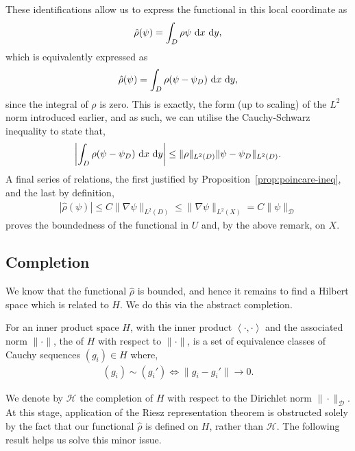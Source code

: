 These identifications allow us to express the functional in this local
coordinate as
\begin{align*}
	\hat{\rho}( \psi ) = \int_{D}{\rho \psi}\operatorname{\, d\!}{x}\operatorname{\, d\!}{y},
\end{align*}
which is equivalently expressed as
\begin{align*}
	\hat{\rho}( \psi ) = \int_{D}{\rho ( \psi - \psi_D )}\operatorname{\, d\!}{x}\operatorname{\, d\!}{y},
\end{align*}
since the integral of $ \rho $ is zero. This is exactly, the form (up to
scaling) of the $ L^2 $ norm introduced earlier, and as such, we can utilise the
Cauchy-Schwarz inequality to state that,
\begin{align*}
	\left| \int_{D}{\rho ( \psi-\psi_D )}\operatorname{\, d\!}{x}\operatorname{\, d\!}{y} \right| \leq \| \rho
	\|_{L^2(D)}\| \psi-\psi_D \|_{L^2(D)}.
\end{align*}
A final series of relations, the first justified by
Proposition~\ref{prop:poincare-ineq}, and the last by definition,
\begin{align*}
	| \hat{\rho}( \psi ) | \leq C \| \nabla \psi \|_{L^2 ( D )}
	\leq \| \nabla \psi \|_{L^2 ( X )} = C \| \psi \|_{\mathcal{D}}
\end{align*}
proves the boundedness of the functional in $ U $ and, by the above remark, on
$ X $.

\subsection{Completion}
We know that the functional $ \hat{\rho} $ is bounded, and hence it remains to
find a Hilbert space which is related to $ H $. We do this via the abstract
completion.

\begin{definition}[Completion]
	For an inner product space $ H $, with the inner product $ \left\langle \cdot
		,\cdot \right\rangle $ and the associated norm $ \|\cdot \| $, the
	 of $ H $ with respect to $ \| \cdot \| $, is a set of
	equivalence classes of Cauchy sequences $ \left( g_i \right) \in H $ where,
	\begin{align*}
		\left( g_i \right)\sim \left( g_i' \right) \iff \|g_i - g_i'\| \to 0.
	\end{align*}
\end{definition}

We denote by $ \mathcal{H} $ the completion of $ H $ with respect to the
Dirichlet norm $ \|\cdot\|_{\mathcal{D}} $. At this stage, application of the
Riesz representation theorem is obstructed solely by the fact that our
functional $ \hat{\rho} $ is defined on $ H $, rather than $ \mathcal{H} $. The
following result helps us solve this minor issue.

